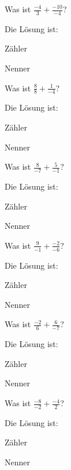\documentclass{ximera}
\begin{document}
\begin{shuffle}
\begin{question}
Was ist $\frac{-4}{3} + \frac{-10}{-4}$?
\begin{solution}
Die Lösung ist:

Zähler 

Nenner 
\end{solution}
\end{question}


\begin{question}
Was ist $\frac{8}{8} + \frac{1}{-4}$?
\begin{solution}
Die Lösung ist:

Zähler 

Nenner 
\end{solution}
\end{question}


\begin{question}
Was ist $\frac{8}{-7} + \frac{5}{-1}$?
\begin{solution}
Die Lösung ist:

Zähler 

Nenner 
\end{solution}
\end{question}


\begin{question}
Was ist $\frac{9}{-1} + \frac{-2}{-6}$?
\begin{solution}
Die Lösung ist:

Zähler 

Nenner 
\end{solution}
\end{question}


\begin{question}
Was ist $\frac{-2}{6} + \frac{6}{-7}$?
\begin{solution}
Die Lösung ist:

Zähler 

Nenner 
\end{solution}
\end{question}


\begin{question}
Was ist $\frac{-8}{-2} + \frac{-4}{2}$?
\begin{solution}
Die Lösung ist:

Zähler 

Nenner 
\end{solution}
\end{question}



\end{shuffle}
\end{document}
